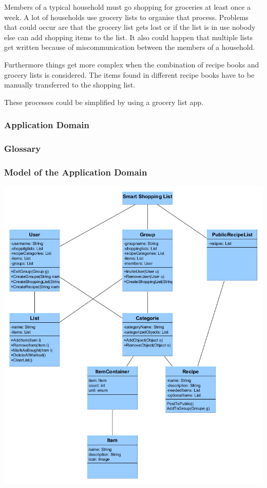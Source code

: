 \documentclass[12pt]{article}
\theoremstyle{definition}
\begin{document}
Members of a typical household must go shopping for groceries at least once a week. A lot of households use grocery lists to organise that process. Problems that could occur are that the grocery list gets lost or if the list is in use nobody else can add shopping items to the list. It also could happen that multiple lists get written because of miscommunication between the members of a household.

Furthermore things get more complex when the combination of recipe books and grocery lists is considered. The items found in different recipe books have to be manually transferred to the shopping list. 

These processes could be simplified by using a grocery list app.

\subsubsection{Application Domain}

\subsubsection{Glossary}

\subsubsection{Model of the Application Domain}

\includegraphics[scale=.65]{UMLClassDiagram.png}
\end{document}
